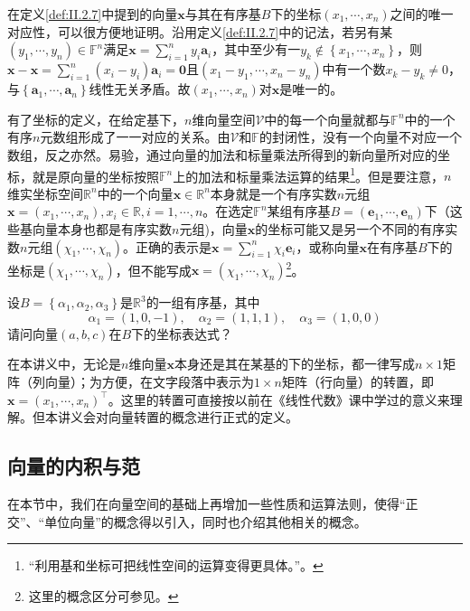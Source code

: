 \documentclass[../main.tex]{subfiles}
\begin{document}
在定义\ref{def:II.2.7}中提到的向量$\mathbf{x}$与其在有序基$B$下的坐标$\left(x_1,\cdots,x_n\right)$之间的唯一对应性，可以很方便地证明。沿用定义\ref{def:II.2.7}中的记法，若另有某$\left(y_1,\cdots,y_n\right)\in\mathbb{F}^n$满足$\mathbf{x}=\sum_{i=1}^ny_i\mathbf{a}_i$，其中至少有一$y_k\notin\left\{x_1,\cdots,x_n\right\}$，则$\mathbf{x}-\mathbf{x}=\sum_{i=1}^n\left(x_i-y_i\right)\mathbf{a}_i=\mathbf{0}$且$\left(x_1-y_1,\cdots,x_n-y_n\right)$中有一个数$x_k-y_k\neq 0$，与$\left\{\mathbf{a}_1,\cdots,\mathbf{a}_n\right\}$线性无关矛盾。故$\left(x_1,\cdots,x_n\right)$对$\mathbf{x}$是唯一的。

有了坐标的定义，在给定基下，$n$维向量空间$\mathcal{V}$中的每一个向量就都与$\mathbb{F}^n$中的一个有序$n$元数组形成了一一对应的关系。由$\mathcal{V}$和$\mathbb{F}$的封闭性，没有一个向量不对应一个数组，反之亦然。易验，通过向量的加法和标量乘法所得到的新向量所对应的坐标，就是原向量的坐标按照$\mathbb{F}^n$上的加法和标量乘法运算的结果\footnote{“利用基和坐标可把线性空间的运算变得更具体。”\cite[p.173]{周胜林2012线性代数}。}。但是要注意，$n$维实坐标空间$\mathbb{R}^n$中的一个向量$\mathbf{x}\in\mathbb{R}^n$本身就是一个有序实数$n$元组$\mathbf{x}=\left(x_1,\cdots,x_n\right),x_i\in\mathbb{R},i=1,\cdots,n$。在选定$\mathbb{F}^n$某组有序基$B=\left(\mathbf{e}_1,\cdots,\mathbf{e}_n\right)$下（这些基向量本身也都是有序实数$n$元组)，向量$\mathbf{x}$的坐标可能又是另一个不同的有序实数$n$元组$\left(\chi_1,\cdots,\chi_n\right)$。正确的表示是$\mathbf{x}=\sum_{i=1}^{n}\chi_i\mathbf{e}_i$，或称向量$\mathbf{x}$在有序基$B$下的坐标是$\left(\chi_1,\cdots,\chi_n\right)$，但不能写成$\mathbf{x}=\left(\chi_1,\cdots,\chi_n\right)$\footnote{这里的概念区分可参见\cite[\S 7.1例题2.1]{周胜林2012线性代数}。}。

\begin{example}
    设$B=\left\{\alpha_1,\alpha_2,\alpha_3\right\}$是$\mathbb{R}^3$的一组有序基，其中
    \[
        \alpha_1=\left(1,0,-1\right),\quad\alpha_2=\left(1,1,1\right),\quad\alpha_3=\left(1,0,0\right)
    \]
    请问向量$\left(a,b,c\right)$在$B$下的坐标表达式？
\end{example}


在本讲义中，无论是$n$维向量$\mathbf{x}$本身还是其在某基的下的坐标，都一律写成$n\times 1$矩阵（列向量）；为方便，在文字段落中表示为$1\times n$矩阵（行向量）的转置，即$\mathbf{x}=\left(x_1,\cdots,x_n\right)^\intercal$。这里的转置可直接按以前在《线性代数》课中学过的意义来理解。但本讲义会对向量转置的概念进行正式的定义。
\subsection{向量的内积与范}\label{sec:II.2.1.4}
在本节中，我们在向量空间的基础上再增加一些性质和运算法则，使得“正交”、“单位向量”的概念得以引入，同时也介绍其他相关的概念。
\end{document}

